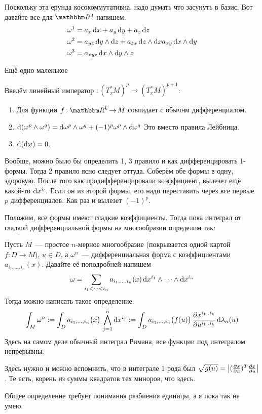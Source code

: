 \documentclass[draft,timbord]{longnotes}
\begin{document}
\begin{exmp}\label{exmp:dg::secint::difformbasis}
  Поскольку эта ерунда косокоммутативна, надо думать что засунуть в базис.
  Вот давайте все для $\R^3$ напишем.
  \begin{align*}
    \omega^1 &= a_x\,\mathrm{d} x + a_y\,\mathrm{d} y + a_z\,\mathrm{d} z \\
    \omega^2 &= a_{yz}\,\mathrm{d} y\wedge\mathrm{d} z+a_{zx}\,\mathrm{d} z \wedge\mathrm{d} xa_{xy}\,\mathrm{d} x\wedge\mathrm{d} y\\
    \omega^3 &= a_{xyz}\,\mathrm{d} x \wedge\mathrm{d} y\wedge z
  \end{align*}
\end{exmp}

Ещё одно маленькое 
\begin{defn}\label{defn:dg::secint::extdiff}
  Введём линейный император $\colon (T^*_xM)^p \to (T^*_xM)^{p+1}$:
  \begin{enumerate}
    \item Для функции $f\colon \R^k \to M$ совпадает с обычнм дифференциалом.
    \item $\mathrm{d} (\omega^p \wedge \omega^q )
      = \mathrm{d} \omega ^p \wedge \omega ^q + (-1)^p \omega ^p \wedge \mathrm{d} \omega ^q$
      Это вместо правила Лейбница.
    \item $\mathrm{d} (\mathrm{d} \omega ) = 0$.
  \end{enumerate}
  Вообще, можно было бы определить 1, 3 правило и как дифференцировать 1-формы.
  Тогда 2 правило ясно следует оттуда. Соберём обе формы в одну, здоровую.
  После того как продифференцировали коэффициент, вылезет ещё какой-то $\mathrm{d} x^{i_l}$.
  Если он из второй формы, его надо переставить через все первые $p$ дифференциалов.
  Как раз и вылезет $(-1)^p$.
\end{defn}

\underdev{}

Положим, все формы имеют гладкие коэффициенты.
Тогда пока интеграл от гладкой дифференциальной формы на многообразии определим так:
\begin{defn}\label{defn:dg::secint::difformint}
  Пусть $M$~--- простое $n$-мерное многообразие (покрывается одной картой $f\colon D \to M$),
  $u\in D$,
  а $\omega^n$~--- дифференциальная форма с коэффициентами $a_{i_1, \dotsc, i_n}(x)$.
  Давайте её поподробней напишем
  \[
    \omega =\sum_{i_{1}<\cdots <i_{n}}
    a_{i_1,\dotsc ,i_n} (x) \,\mathrm{d} x^{i_1} \wedge \dotsm \wedge \mathrm{d} x^{i_n}
  \]
  Тогда можно написать такое определение:
  \[ 
    \int_M \omega^n 
    := \int_D a_{i_1,\dotsc ,i_n}\bigl(x\bigr) 
    \, \bigwedge_{j=1}^n \mathrm{d} x^{i_j} 
    := \int_D a_{i_1,\dotsc ,i_n}\bigl(f(u)\bigr) 
    \, \frac{\partial x^{i_1 \mathbin{..} i_k}}{\partial u^{i_1 \mathbin{..} i_k }} \, \mathrm{d} \lambda_n(u) 
  \]
  Здесь на самом деле обычный интеграл Римана, все функции под интегралом непрерывны.
\end{defn}
\begin{rem}\label{rem:dg::secint::noord}
  Здесь нужно и можно вспомнить, что в интеграле 1 рода был 
  $\sqrt{g(u)} = \left|(\frac{\partial x}{\partial u})^T\frac{\partial x}{\partial u}\right|$. Те есть, корень из суммы квадратов
  тех миноров, что здесь.
\end{rem}
Общее определение требует понимания разбиения единицы, а я пока так не умею.
\end{document}
